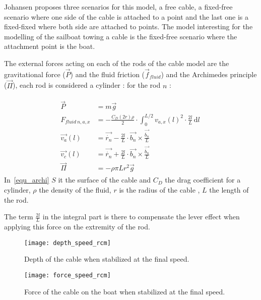 Johansen proposes three scenarios for this model, a free cable, a fixed-free scenario where one side of the cable is attached to a point and the last one is a fixed-fixed where both side are attached to points.
The model interesting for the modelling of the sailboat towing a cable is the fixed-free scenario where the attachment point is the boat.

The external forces acting on each of the rods of the cable model are the gravitational force ($\vec{P}$) and the fluid friction ($\vec{f}_{fluid}$) and the Archimedes principle ($\vec{\Pi}$), each rod is considered a cylinder : for the rod $n$ :

{
\begin{align}
\begin{split}
\vec{P} &= m \vec{g}  \\
F_{fluid~n,a,x} &= -\frac{C_D (2 r ) \rho}{2} \cdot \displaystyle \int_{0}^{L/2} v_{a,x}(l)^2 \cdot \frac{2l}{L} \, \mathrm{d}l\  \\
\vec{v_{a}}(l) &= \vec{\dot{r_n}} - \frac{2 l}{L} \cdot \vec{b_n} \times \frac{\vec{\dot{b_n}}}{L} \nonumber \\
\vec{v_{c}}(l) &= \vec{\dot{r_n}} + \frac{2 l}{L} \cdot \vec{b_n} \times \frac{\vec{\dot{b_n}}}{L} \nonumber\\
\vec{\Pi} &= - \rho \pi L r^2 \vec{g} \label{equ_archi}
\end{split}
\end{align}
}
In~\ref{equ_archi}  $S$  it the surface of the cable and $C_D$ the drag coefficient for a cylinder, $\rho$ the density of the fluid, $r$ is the radius of the cable , $L$ the length of the rod.

The term $\frac{2 l}{L}$ in the integral part is there to compensate the lever effect when applying this force on the extremity of the rod.



\begin{figure}[H]
\centering
    \begin{minipage}[b]{0.4\textwidth}
    \centering
    \texttt{[image: depth\_speed\_rcm]}
    \caption{Depth of the cable when stabilized at the final speed.}
    \label{fig:depthIndSpeed}
    \end{minipage}
    \hfill
    \begin{minipage}[b]{0.45\textwidth}
    \centering
    \texttt{[image: force\_speed\_rcm]}
    \caption{Force of the cable on the boat when stabilized at the final speed.}
    \label{fig:forceIndSpeed}
    \end{minipage}
\end{figure}

